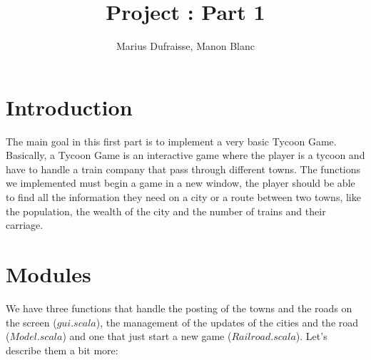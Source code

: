\documentclass[a4paper]{article}
\title{Project : Part 1}
\author{Marius Dufraisse, Manon Blanc}
\date{ }
\begin{document}
	\maketitle
	\thispagestyle{fancy}
	\section{Introduction}
	
	The main goal in this first part is to implement a very basic Tycoon Game. Basically, a Tycoon Game is an interactive game where the player is a tycoon and have to handle a train company that pass through different towns. The functions we implemented must begin a game in a new window, the player should be able to find all the information they need on a city or a route between two towns, like the population, the wealth of the city and the number of trains and their carriage. 
	
	\section{Modules}
	
	We have three functions that handle the posting of the towns and the roads on the screen ($gui.scala$), the management of the updates of the cities and the road ($Model.scala$) and one that just start a new game ($Railroad.scala$). Let's describe them a bit more:
	
\end{document}
